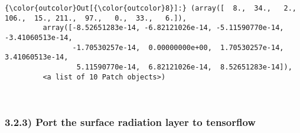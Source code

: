 \documentclass[11pt]{article}
\begin{document}
\begin{Verbatim}[commandchars=\\\{\}]
{\color{outcolor}Out[{\color{outcolor}8}]:} (array([  8.,  34.,   2., 106.,  15., 211.,  97.,   0.,  33.,   6.]),
         array([-8.52651283e-14, -6.82121026e-14, -5.11590770e-14, -3.41060513e-14,
                -1.70530257e-14,  0.00000000e+00,  1.70530257e-14,  3.41060513e-14,
                 5.11590770e-14,  6.82121026e-14,  8.52651283e-14]),
         <a list of 10 Patch objects>)
\end{Verbatim}
            
    \begin{center}
    \end{center}
    { \hspace*{\fill} \\}
    
    \hypertarget{port-the-surface-radiation-layer-to-tensorflow}{%
\subsubsection{3.2.3) Port the surface radiation layer to
tensorflow}\label{port-the-surface-radiation-layer-to-tensorflow}}
\end{document}
